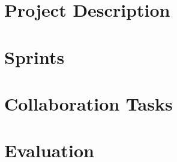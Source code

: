 \part*{Project Description}



\part{Sprints}




\part{Collaboration Tasks}


\part{Evaluation}




